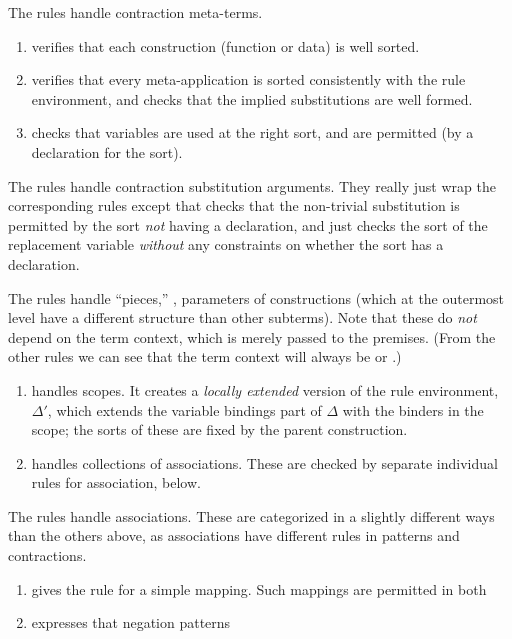 \documentclass[letterpaper,10pt]{proc}
\begin{document}
The  rules handle contraction meta-terms.
\begin{enumerate}

\item {} verifies that each construction (function or data) is well sorted.

\item {} verifies that every meta-application is sorted consistently with the rule
  environment, and checks that the implied substitutions are well formed.

\item {} checks that variables are used at the right sort, and are permitted (by a
   declaration for the sort).

\end{enumerate}

The  rules handle contraction substitution arguments. They really just wrap the
corresponding  rules except that  checks that the
non-trivial substitution is permitted by the sort \emph{not} having a  declaration,
and  just checks the sort of the replacement variable \emph{without} any
constraints on whether the sort has a  declaration.

The  rules handle ``pieces,'' \ie, parameters of constructions (which at the
outermost level have a different structure than other subterms). Note that these do \emph{not}
depend on the term context, which is merely passed to the premises. (From the other rules we can
see that the term context will always be  or .)
\begin{enumerate}

\item {} handles scopes. It creates a \emph{locally extended} version of the rule
  environment, $Δ'$, which extends the variable bindings part of $Δ$ with the binders in the
  scope; the sorts of these are fixed by the parent construction.

\item {} handles collections of associations. These are checked by separate
  individual rules for association, below.

\end{enumerate}

The  rules handle associations. These are categorized in a slightly different ways
than the others above, as associations have different rules in patterns and contractions.
\begin{enumerate}

\item {} gives the rule for a simple mapping. Such mappings are permitted in both 

\item {} expresses that negation patterns

\end{enumerate}
\end{document}
